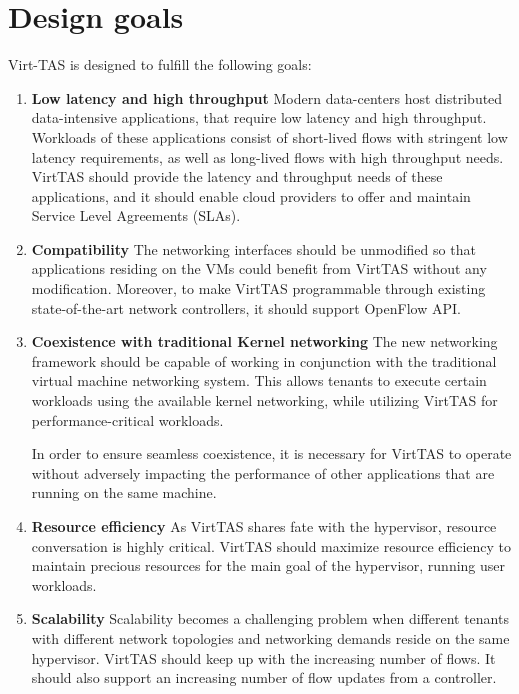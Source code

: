 
\section{Design goals}
Virt-TAS is designed to fulfill the following goals:

\begin{enumerate}
    \item \textbf{Low latency and high throughput} %
    Modern data-centers host distributed data-intensive applications, that require 
    low latency and high throughput. Workloads of these applications consist of short-lived 
    flows with stringent low latency requirements, as well as long-lived flows with 
    high throughput needs. VirtTAS should provide the latency and throughput needs 
    of these applications, and it should enable cloud providers to offer and maintain
    Service Level Agreements (SLAs). 
    
    \item \textbf{Compatibility} %
    The networking interfaces should be unmodified so that applications residing on 
    the VMs could benefit from VirtTAS without any modification.
    Moreover, to make VirtTAS programmable through existing state-of-the-art network controllers,
    it should support OpenFlow API.

    \item \textbf{Coexistence with traditional Kernel networking}
    The new networking framework should be capable of working in conjunction with the 
    traditional virtual machine networking system. This allows tenants to execute certain
    workloads using the available kernel networking, while utilizing VirtTAS for
    performance-critical workloads.
    
    In order to ensure seamless coexistence, it is 
    necessary for VirtTAS to operate without adversely impacting the performance of 
    other applications that are running on the same machine. 

    \item \textbf{Resource efficiency}
    As VirtTAS shares fate with the hypervisor, resource conversation is highly critical. 
    VirtTAS should maximize resource efficiency to maintain precious resources for the 
    main goal of the hypervisor, running user workloads.

    \item \textbf{Scalability} %
    Scalability becomes a challenging problem when different tenants with different network 
    topologies and networking demands reside on the same hypervisor. VirtTAS should keep up 
    with the increasing number of flows. It should also support an increasing number of flow 
    updates from a controller.
\end{enumerate}

